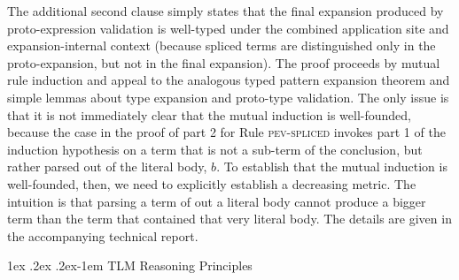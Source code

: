 \documentclass[acmsmall]{acmart}
\makeatletter
\renewcommand{\subsubsection}{%
  \@startsection{subsubsection}{3}%
  {\z@}{1ex \@plus .2ex \@minus .2ex}{-1em}%
  {\normalfont\normalsize\bfseries}%
}
\makeatother
\begin{document}
The additional second clause simply states that the final expansion produced by proto-expression validation is well-typed under the combined application site and expansion-internal context (because spliced terms are distinguished only in the proto-expansion, but not in the final expansion). %
The proof proceeds by mutual rule induction and appeal to the analogous typed pattern expansion theorem and simple lemmas about type expansion   and proto-type validation. The only issue is that it is not immediately clear that the mutual induction is well-founded, because the case in the proof of part 2 for Rule \textsc{pev-spliced} invokes part 1 of the induction hypothesis on a term that is not a sub-term of the conclusion, but rather parsed out of the literal body, $b$. To establish that the mutual induction is well-founded, then, we need to explicitly establish a decreasing metric. The intuition is that parsing a term of out a literal body cannot produce a bigger term than the term that contained that very literal body. 
The details are given in the accompanying technical report.



\subsubsection{TLM Reasoning Principles} 
\end{document}
